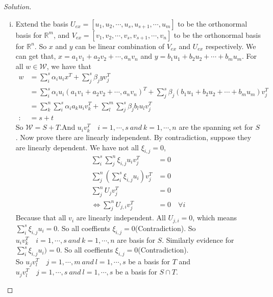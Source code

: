 \documentclass[a4paper]{article}
\newenvironment{solution}
  {\renewcommand\qedsymbol{$\blacksquare$}\begin{proof}[Solution]}
  {\end{proof}}
\begin{document}
\begin{description}
  \begin{solution}\
    \begin{enumerate}[i)]
      \item Extend the basis $U_{ex}=\left[u_{1},u_{2},\cdots,u_{s},u_{s+1},\cdots,u_{m}\right]$ to be the orthonormal basis for $\mathbb{R}^{m}$, and $V_{ex}=\left[v_{1},v_{2},\cdots,v_{s},v_{s+1},\cdots,v_{n}\right]$ to be the orthonormal basis for $\mathbb{R}^{n}$. So $x$ and $y$ can be linear combination of $V_{ex}$ and $U_{ex}$ respectively.
      We can get that, $x=a_{1}v_{1}+a_{2}v_{2}+\cdots,a_{n}v_{n}$ and $y=b_{1}u_{1}+b_{2}u_{2}+\cdots+b_{m}u_{m}$.
      For all $w \in \mathcal{W}$, we have that
      \begin{align*}
        w&=\sum_{i}^{s}\alpha_{i}u_{i}x^{T}+\sum_{j}^{s}\beta_{j}yv_{j}^{T}\\
        &=\sum_{i}^{s}\alpha_{i}u_{i}(a_{1}v_{1}+a_{2}v_{2}+\cdots,a_{n}v_{n})^{T}+\sum_{j}^{s}\beta_{j}(b_{1}u_{1}+b_{2}u_{2}+\cdots+b_{m}u_{m})v_{j}^{T}\\
        &=\sum_{k}^{n}\sum_{i}^{s}\alpha_{i}a_{k}u_{i}v_{k}^{T}+\sum_{l}^{m}\sum_{j}^{s}\beta_{j}b_{l}u_{l}v_{j}^{T}\\
        :&=s+t
      \end{align*}
      So $\mathcal{W}=S+T$.And $u_{i}v_{k}^{T}\quad i=1,\cdots,s \ and\  k=1,\cdots,n$ are the spanning set for $S$. Now prove there are linearly independent. By contradiction, suppose they are linearly dependent. We have not all $\xi_{i,j}=0$,
      \begin{align*}
        \sum_{i}^{s}\sum_{j}^{n}\xi_{i,j}u_{i}v_{j}^{T}&=0\\
        \sum_{j}^{n} (\sum_{i}^{s}\xi_{i,j}u_{i})v_{j}^{T}&=0\\
        \sum_{j}^{n}U_{j}v_{j}^{T}&=0\\
        \Longleftrightarrow \sum_{j}^{n}U_{j,i}v_{j}^{T}&=0 \quad \forall i
      \end{align*}
      Because that all $v_{i}$ are linearly independent. All $U_{j,i}=0$, which means $\sum_{i}^{s}\xi_{i,j}u_{i}=0$. So all coeffients $\xi_{i,j}=0$(Contradiction). So $u_{i}v_{k}^{T}\quad i=1,\cdots,s \ and\  k=1,\cdots,n$ are basis for $S$. Similarly evidence for $\sum_{i}^{s}\xi_{i,j}u_{i})=0$. So all coeffients $\xi_{i,j}=0$(Contradiction). \\
      So $u_{j}v_{l}^{T}\quad j=1,\cdots,m \ and\  l=1,\cdots,s$ be a basis for $T$ and $u_{j}v_{l}^{T}\quad j=1,\cdots,s \ and\  l=1,\cdots,s$ be a basis for $S\cap T$.\\

\end{enumerate}
\end{solution}
\end{description}
\end{document}
